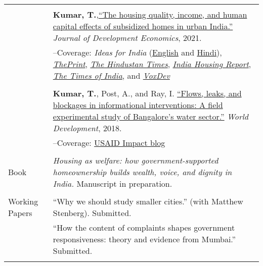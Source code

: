 \documentclass[letterpaper, 10pt]{article}
\begin{document}
\begin{longtable}{p{1in}p{5.5in}}
& \\

&\textbf{Kumar, T.},\href{https://doi.org/10.1016/j.jdeveco.2021.102738}{``The housing quality, income, and human capital effects of subsidized homes in urban India.''} \textit{Journal of Development Economics}, 2021.\\

&--\indent Coverage: \textit{Ideas for India} (\href{https://www.ideasforindia.in/topics/poverty-inequality/household-level-effects-of-affordable-housing-evidence-from-mumbai.html}{English} and \href{https://www.ideasforindia.in/topics/poverty-inequality/household-level-effects-of-affordable-housing-evidence-from-mumbai-hindi.html}{Hindi}), \href{https://theprint.in/opinion/mumbai-residents-win-govt-housing-lottery-and-spend-more-on-kids-education-jobs-study/290485/}{\textit{ThePrint}}, \href{https://www.hindustantimes.com/opinion/housing-is-a-welfare-weapon-it-can-help-people-escape-poverty-101629993983576.html}{\textit{The Hindustan Times}}, \href{https://indiahousingreport.in/outputs/opinion/housing-is-a-welfare-weapon-it-can-help-people-escape-poverty/}{\textit{India Housing Report}}, \href{https://timesofindia.indiatimes.com/city/mumbai/mhada-home-winners-see-upswing-in-family-edu-pay-in-mumbai-study/articleshow/86468320.cms}{\textit{The Times of India}}, and \href{https://voxdev.org/topic/infrastructure-urbanisation/household-level-effects-subsidised-housing-evidence-urban-india?utm_source=dlvr.it&utm_medium=twitter}{\textit{VoxDev}} \\
& \\

&\textbf{Kumar, T.}, Post, A., and Ray, I. \href{https://www.sciencedirect.com/science/article/pii/S0305750X1830032}{``Flows, leaks, and blockages in informational interventions: A field experimental study of Bangalore's water sector.''} \textit{World Development}, 2018.\\

&--\indent Coverage: \href{https://blog.usaid.gov/2016/05/using-mobile-phones-to-alert-households-waiting-for-nextdrop-of-water/}{USAID Impact blog} \\
& \\

{{Book}} 
& \textit{Housing as welfare: how government-supported homeownership builds wealth, voice, and dignity in India.} Manuscript in preparation. \\
& \\


{{Working Papers}} 
& ``Why we should study smaller cities.'' (with Matthew Stenberg). Submitted. \\
& ``How the content of complaints shapes government responsiveness: theory and evidence from Mumbai.'' Submitted. \\
& \\



\end{longtable}
\end{document}
